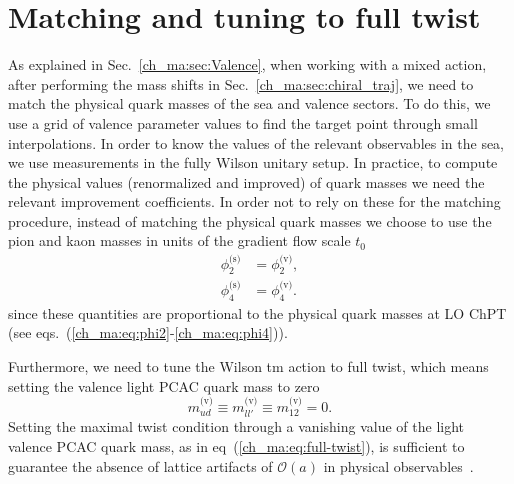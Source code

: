 

\section{Matching and tuning to full twist}
\label{ch_ma:sec:matching}

As explained in Sec.~\ref{ch_ma:sec:Valence}, when working with a mixed action, after performing the mass shifts in Sec.~\ref{ch_ma:sec:chiral_traj}, we need to match the physical quark masses of the sea and valence sectors. To do this, we use a grid of valence parameter values to find the target point through small interpolations. In order to know the values of the relevant observables in the sea, we use measurements in the fully Wilson unitary setup. In practice, to compute the physical values (renormalized and improved) of quark masses we need the relevant improvement coefficients. In order not to rely on these for the matching procedure, instead of matching the physical quark masses we choose to use the pion and kaon masses in units of the gradient flow scale $t_0$
\begin{align}
\label{ch_ma:eq:matching}
\phi_2^{\textrm{(s)}}&=\phi_2^{\textrm{(v)}},\\
\phi_4^{\textrm{(s)}}&=\phi_4^{\textrm{(v)}}.
\end{align}
since these quantities are proportional to the physical quark masses at LO ChPT (see eqs.~(\ref{ch_ma:eq:phi2}-\ref{ch_ma:eq:phi4})).

Furthermore, we need to tune the Wilson tm action to full twist, which means setting the valence light PCAC quark mass to zero
\begin{equation}
\label{ch_ma:eq:full-twist}
m_{ud}^{\textrm{(v)}}\equiv m_{ll'}^{\textrm{(v)}}\equiv m_{12}^{\textrm{(v)}}=0.
\end{equation}
Setting the maximal twist condition through a vanishing value of the light valence PCAC quark mass, as in eq~(\ref{ch_ma:eq:full-twist}), is sufficient to guarantee the absence of lattice artifacts of $\mathcal{O}(a)$ in physical observables~\citep{Frezzotti:2003ni, ETM:2008zte}. 

